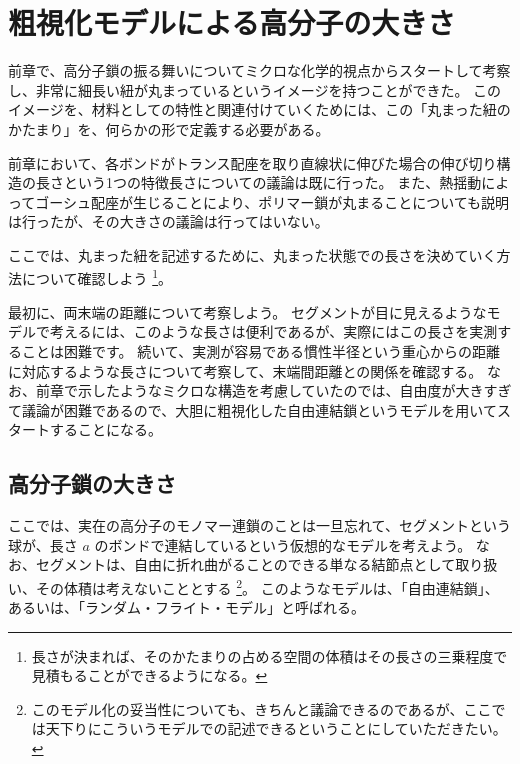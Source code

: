\documentclass[a4paper,11pt]{jlreq}
\begin{document}
\section{粗視化モデルによる高分子の大きさ}
\label{sec:CG_model}

前章で、高分子鎖の振る舞いについてミクロな化学的視点からスタートして考察し、非常に細長い紐が丸まっているというイメージを持つことができた。
このイメージを、材料としての特性と関連付けていくためには、この「丸まった紐のかたまり」を、何らかの形で定義する必要がある。

前章において、各ボンドがトランス配座を取り直線状に伸びた場合の伸び切り構造の長さという1つの特徴長さについての議論は既に行った。
また、熱揺動によってゴーシュ配座が生じることにより、ポリマー鎖が丸まることについても説明は行ったが、その大きさの議論は行ってはいない。

ここでは、丸まった紐を記述するために、丸まった状態での長さを決めていく方法について確認しよう
\footnote{
	長さが決まれば、そのかたまりの占める空間の体積はその長さの三乗程度で見積もることができるようになる。
}。

最初に、両末端の距離について考察しよう。
セグメントが目に見えるようなモデルで考えるには、このような長さは便利であるが、実際にはこの長さを実測することは困難です。
続いて、実測が容易である慣性半径という重心からの距離に対応するような長さについて考察して、末端間距離との関係を確認する。
なお、前章で示したようなミクロな構造を考慮していたのでは、自由度が大きすぎて議論が困難であるので、大胆に粗視化した自由連結鎖というモデルを用いてスタートすることになる。


%


\subsection{高分子鎖の大きさ}

ここでは、実在の高分子のモノマー連鎖のことは一旦忘れて、セグメントという球が、長さ $a$ のボンドで連結しているという仮想的なモデルを考えよう。
なお、セグメントは、自由に折れ曲がることのできる単なる結節点として取り扱い、その体積は考えないこととする
\footnote
{
このモデル化の妥当性についても、きちんと議論できるのであるが、ここでは天下りにこういうモデルでの記述できるということにしていただきたい。
}。
このようなモデルは、「自由連結鎖」、あるいは、「ランダム・フライト・モデル」と呼ばれる。
\end{document}
